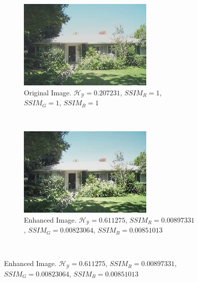 \documentclass[11pt]{article}
\begin{document}
\begin{figure}[H]
    \centering
    \begin{subfigure}[t]{0.45\textwidth}
        \includegraphics[width=\textwidth]{calhouse_0230.jpg}
        \caption{Original Image. $\mathscr{H_Y}=0.207231$, $SSIM_R=1$, $SSIM_G=1$, $SSIM_B=1$}
        \label{fig:casa1original}
    \end{subfigure}
    ~ %
    \begin{subfigure}[t]{0.45\textwidth}
        \includegraphics[width=\textwidth]{calhouse_0230_20-25165283474-10.jpg}
        \caption{Enhanced Image. $\mathscr{H_Y}=0.611275$, $SSIM_R=0.00897331$, $SSIM_G=0.00823064$, $SSIM_B=0.00851013$}
        \label{fig:casa1enhanced1}
    \end{subfigure} \\

\end{figure}
\end{document}
